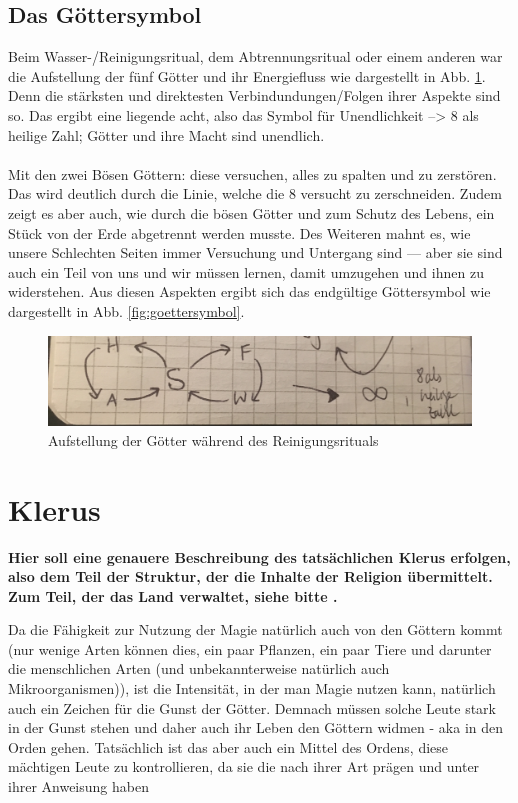 \subsection{Das Göttersymbol} \label{sec:goettersymbol}
Beim Wasser-/Reinigungsritual, dem Abtrennungsritual oder einem anderen war die Aufstellung der fünf Götter und ihr Energiefluss wie dargestellt in Abb. \ref{fig:goetteraufstellung}. Denn die stärksten und direktesten Verbindundungen/Folgen ihrer Aspekte sind so. Das ergibt eine liegende acht, also das Symbol für Unendlichkeit --> 8 als heilige Zahl; Götter und ihre Macht sind unendlich.\\
\\
Mit den zwei Bösen Göttern: diese versuchen, alles zu spalten und zu zerstören. Das wird deutlich durch die Linie, welche die 8 versucht zu zerschneiden. Zudem zeigt es aber auch, wie durch die bösen Götter und zum Schutz des Lebens, ein Stück von der Erde abgetrennt werden musste. Des Weiteren mahnt es, wie unsere Schlechten Seiten immer Versuchung und Untergang sind — aber sie sind auch ein Teil von uns und wir müssen lernen, damit umzugehen und ihnen zu widerstehen. Aus diesen Aspekten ergibt sich das endgültige Göttersymbol wie dargestellt in Abb. \ref{fig:goettersymbol}.\\

\begin{figure}
	\centering
	\includegraphics[width=0.7\linewidth]{Abbildungen/Gesellschaft/GoetteraufstellungbeiReinigungsritual}
	\caption{Aufstellung der Götter während des Reinigungsrituals}
	\label{fig:goetteraufstellung}
\end{figure}

\section{Klerus}
\textbf{Hier soll eine genauere Beschreibung des tatsächlichen Klerus erfolgen, also dem Teil der Struktur, der die Inhalte der Religion übermittelt. Zum Teil, der das Land verwaltet, siehe bitte .} 

Da die Fähigkeit zur Nutzung der Magie natürlich auch von den Göttern kommt (nur wenige Arten können dies, ein paar Pflanzen, ein paar Tiere und darunter die menschlichen Arten (und unbekannterweise natürlich auch Mikroorganismen)), ist die Intensität, in der man Magie nutzen kann, natürlich auch ein Zeichen für die Gunst der Götter. Demnach müssen solche Leute stark in der Gunst stehen und daher auch ihr Leben den Göttern widmen - aka in den Orden gehen. Tatsächlich ist das aber auch ein Mittel des Ordens, diese mächtigen Leute zu kontrollieren, da sie die nach ihrer Art prägen und unter ihrer Anweisung haben

